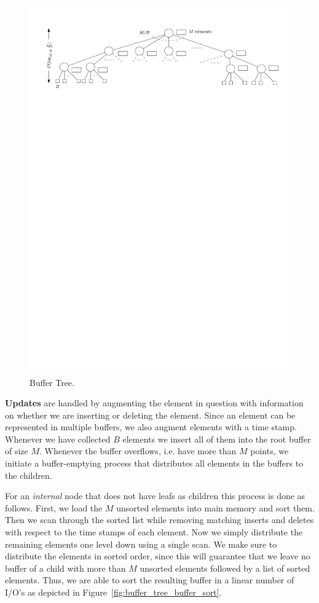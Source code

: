 \documentclass[twoside,11pt,openright]{report}
\begin{document}
\begin{figure}[h]
	\centering
	\includegraphics[width=1\textwidth]{../figures/buffer_tree}
	\caption{Buffer Tree.}
	\label{fig:buffer_tree}
\end{figure}

\textbf{Updates} are handled by augmenting the element in question with information on whether we are inserting or deleting the element. Since an element can be represented in multiple buffers, we also augment elements with a time stamp.
Whenever we have collected $B$ elements we insert all of them into the root buffer of size $M$. Whenever the buffer overflows, i.e. have more than $M$ points, we initiate a buffer-emptying process that distributes all elements in the buffers to the children.

For an \textit{internal} node that does not have leafs as children this process is done as follows. First, we load the $M$ unsorted elements into main memory and sort them. Then we scan through the sorted list while removing matching inserts and deletes with respect to the time stamps of each element. Now we simply distribute the remaining elements one level down using a single scan. We make sure to distribute the elements in sorted order, since this will guarantee that we leave no buffer of a child with more than $M$ unsorted elements followed by a list of sorted elements. Thus, we are able to sort the resulting buffer in a linear number of I/O's as depicted in Figure~\ref{fig:buffer_tree_buffer_sort}.
\end{document}
